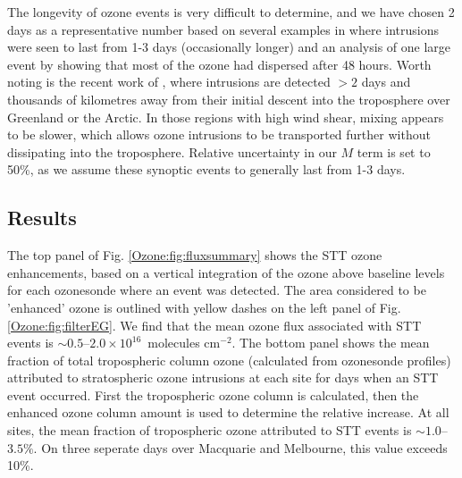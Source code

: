     The longevity of ozone events is very difficult to determine, and we have chosen 2 days as a representative number based on several examples in \cite{Lin2012} where intrusions were seen to last from 1-3 days (occasionally longer) and an analysis of one large event by \cite{Cooper2004} showing that most of the ozone had dispersed after 48 hours.
    Worth noting is the recent work of \cite{Trickl2014}, where intrusions are detected $>2$ days and thousands of kilometres away from their initial descent into the troposphere over Greenland or the Arctic.
    In those regions with high wind shear, mixing appears to be slower, which allows ozone intrusions to be transported further without dissipating into the troposphere.
    Relative uncertainty in our $M$ term is set to 50\%, as we assume these synoptic events to generally last from 1-3 days.
  
  \subsection{Results}
    
    The top panel of Fig. \ref{Ozone:fig:fluxsummary} shows the STT ozone enhancements, based on a vertical integration of the ozone above baseline levels for each ozonesonde where an event was detected.
    The area considered to be 'enhanced' ozone is outlined with yellow dashes on the left panel of Fig. \ref{Ozone:fig:filterEG}.
    We find that the mean ozone flux associated with STT events is $\sim 0.5$--$2.0 \times 10^{16}$~molecules cm$^{-2}$.
    The bottom panel shows the mean fraction of total tropospheric column ozone (calculated from ozonesonde profiles) attributed to stratospheric ozone intrusions at each site for days when an STT event occurred.
    First the tropospheric ozone column is calculated, then the enhanced ozone column amount is used to determine the relative increase.
    At all sites, the mean fraction of tropospheric ozone attributed to STT events is $\sim 1.0$--$3.5\%$.
    On three seperate days over Macquarie and Melbourne, this value exceeds 10\%.
    
